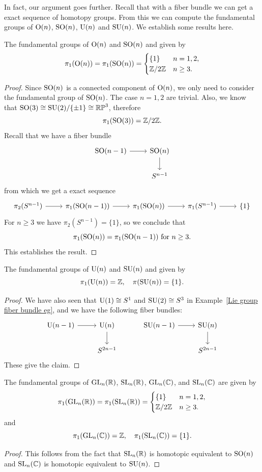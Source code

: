 In fact, our argument goes further. Recall that with a fiber bundle we can get a exact sequence of homotopy groups. From this we can compute the fundamental groups of $\mathrm{O}(n)$, $\mathrm{SO}(n)$, $\mathrm{U}(n)$ and $\mathrm{SU}(n)$. We establish some results here.
\begin{proposition}
The fundamental groups of $\mathrm{O}(n)$ and $\mathrm{SO}(n)$ and given by
\[\pi_1(\mathrm{O}(n))=\pi_1(\mathrm{SO}(n))=\begin{cases}
\{1\}&n=1,2,\\
\mathbb{Z}/2\mathbb{Z}&n\geq 3.
\end{cases}\]
\end{proposition}
\begin{proof}
Since $\mathrm{SO}(n)$ is a connected component of $\mathrm{O}(n)$, we only need to consider the fundamental group of $\mathrm{SO}(n)$. The case $n=1,2$ are trivial. Also, we know that $\mathrm{SO}(3)\cong\mathrm{SU}(2)/\{\pm 1\}\cong\mathbb{RP}^3$, therefore
\[\pi_1(\mathrm{SO}(3))=\mathbb{Z}/2\mathbb{Z}.\]
Recall that we have a fiber bundle
\[\begin{tikzcd}
\SO(n-1)\ar[r]&\SO(n)\ar[d]\\
&S^{n-1}
\end{tikzcd}\]
from which we get a exact sequence
\[\begin{tikzcd}
\pi_2(S^{n-1})\ar[r]&\pi_1(\SO(n-1))\ar[r]&\pi_1(\SO(n))\ar[r]&\pi_1(S^{n-1})\ar[r]&\{1\}
\end{tikzcd}\]
For $n\geq 3$ we have $\pi_2(S^{n-1})=\{1\}$, so we conclude that
\[\pi_1(\mathrm{SO}(n))=\pi_1(\mathrm{SO}(n-1))\text{ for $n\geq 3$}.\]
This establishes the result.
\end{proof}
\begin{proposition}
The fundamental groups of $\mathrm{U}(n)$ and $\mathrm{SU}(n)$ and given by
\[\pi_1(\mathrm{U}(n))=\mathbb{Z},\quad \pi(\mathrm{SU}(n))=\{1\}.\]
\end{proposition}
\begin{proof}
We have also seen that $\mathrm{U}(1)\cong S^1$ and $\mathrm{SU}(2)\cong S^3$ in Example~\ref{Lie group fiber bundle eg}, and we have the following fiber bundles:
\[\begin{tikzcd}
\U(n-1)\ar[r]&\U(n)\ar[d]\\
&S^{2n-1}
\end{tikzcd}\quad\quad\quad\begin{tikzcd}
\SU(n-1)\ar[r]&\SU(n)\ar[d]\\
&S^{2n-1}
\end{tikzcd}\]
These give the claim.
\end{proof}
\begin{proposition}
The fundamental groups of $\mathrm{GL}_n(\mathbb{R})$, $\mathrm{SL}_n(\mathbb{R})$, $\mathrm{GL}_n(\mathbb{C})$, and $\mathrm{SL}_n(\mathbb{C})$ are given by
\[\pi_1(\mathrm{GL}_n(\mathbb{R}))=\pi_1(\mathrm{SL}_n(\mathbb{R}))=\begin{cases}
\{1\}&n=1,2,\\
\mathbb{Z}/2\mathbb{Z}&n\geq 3.
\end{cases}\]
and
\[\pi_1(\mathrm{GL}_n(\mathbb{C}))=\mathbb{Z},\quad\pi_1(\mathrm{SL}_n(\mathbb{C}))=\{1\}.\]
\end{proposition}
\begin{proof}
This follows from the fact that $\mathrm{SL}_n(\mathbb{R})$ is homotopic equivalent to $\mathrm{SO}(n)$ and $\mathrm{SL}_n(\mathbb{C})$ is homotopic equivalent to $\mathrm{SU}(n)$. 
\end{proof}